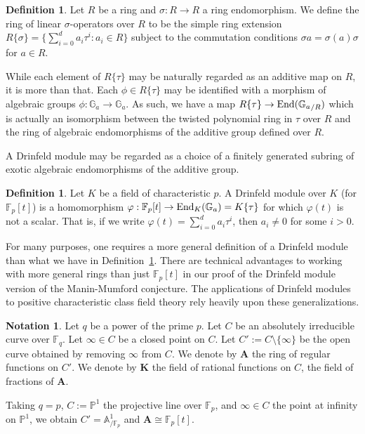 \documentclass{amsart}
\newcommand{\Ga}{{{\mathbb G}_a}}
\newcommand{\FF}{{\mathbb F}}
\newcommand{\bA}{{\mathbf A}}
\theoremstyle{definition}
\newtheorem{Def}[thm]{Definition}
\newtheorem{note}[thm]{Notation}
\theoremstyle{remark}
\begin{document}
\begin{Def}
Let $R$ be a ring and $\sigma:R \to R$ a ring endomorphism.  
We define the ring of linear $\sigma$-operators over $R$ to be the 
simple ring extension $R \{ \sigma \} = \{ \sum_{i=0}^d a_i \tau^i : a_i \in R \}$
subject to the commutation conditions $\sigma a = \sigma(a) \sigma$ for $a \in R$.
\end{Def}

While each element of $R \{ \tau \}$ may be naturally regarded as an additive
map on $R$, it is more than that.  Each $\phi \in R \{ \tau \}$ may be identified with 
a morphism of algebraic groups $\phi:\Ga \to \Ga$.  As such, we have 
a map $R \{ \tau \} \to {\rm End} (\Ga_{/R})$ which is actually an isomorphism
between the twisted polynomial ring in $\tau$ over $R$ and the ring of algebraic 
endomorphisms of the additive group defined over $R$.   

A Drinfeld module may be regarded as a choice of a finitely generated subring of 
exotic algebraic endomorphisms of the additive group.

\begin{Def}
\label{dmfpt}
Let $K$ be a field of characteristic $p$.  A Drinfeld module over $K$ 
(for $\FF_p[t]$) is a homomorphism $\varphi:\FF_p[t] \to {\rm End}_K(\Ga) = K \{ \tau \}$
for which $\varphi(t)$ is not a scalar.  That is, if we write
 $\varphi(t) = \sum_{i=0}^d a_i \tau^i$, then $a_i \neq 0$ for some $i > 0$.
\end{Def}

For many purposes, one requires a more general definition of a Drinfeld module
than what we have in Definition~\ref{dmfpt}.  There are technical advantages to 
working with more general rings than just $\FF_p[t]$ in our proof of the 
Drinfeld module version of the Manin-Mumford conjecture.  The applications of
Drinfeld modules to positive characteristic class field theory rely heavily upon
these generalizations.

\begin{note}
Let $q$ be a power of the prime $p$.  Let $C$ be an absolutely irreducible
curve over $\FF_q$.  Let $\infty \in C$ be a closed point on $C$.  
Let $C' := C \setminus \{ \infty \}$ be the open curve obtained
by removing $\infty$ from $C$.  We denote by ${\mathbf A}$ the 
ring of regular functions on $C'$.  We denote by ${\mathbf K}$ the
field of rational functions on $C$, the field of fractions of ${\mathbf A}$.
\end{note}

Taking $q = p$, $C := {\mathbb P}^1$ the projective line over $\FF_p$, 
and $\infty \in C$ the point at infinity on ${\mathbb P}^1$, we obtain
$C' = {\mathbb A}^1_{/\FF_p}$ and $\bA \cong \FF_p[t]$.   
\end{document}

